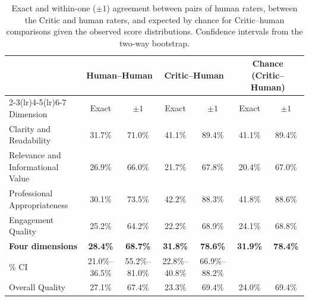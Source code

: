 \documentclass[a4paper,twoside]{article}
\begin{document}
\begin{table}[t]
\centering
\caption{Exact and within-one ($\pm1$) agreement between pairs of human raters, between the Critic and human raters, and expected by chance for Critic--human comparisons given the observed score distributions. Confidence intervals from the two-way bootstrap.}
\label{tab:agreement}
\small
\begin{tabular}{lcccccc}
\toprule
 & \multicolumn{2}{c}{Human--Human} & \multicolumn{2}{c}{Critic--Human} & \multicolumn{2}{c}{Chance (Critic--Human)} \\
\cmidrule(lr){2-3}\cmidrule(lr){4-5}\cmidrule(lr){6-7}
Dimension & Exact & $\pm1$ & Exact & $\pm1$ & Exact & $\pm1$ \\
\midrule
Clarity and Readability & 31.7\% & 71.0\% & 41.1\% & 89.4\% & 41.1\% & 89.4\% \\
Relevance and Informational Value & 26.9\% & 66.0\% & 21.7\% & 67.8\% & 20.4\% & 67.0\% \\
Professional Appropriateness & 30.1\% & 73.5\% & 42.2\% & 88.3\% & 41.8\% & 88.6\% \\
Engagement Quality & 25.2\% & 64.2\% & 22.2\% & 68.9\% & 24.1\% & 68.8\% \\
\midrule
\textbf{Four dimensions} & \textbf{28.4\%} & \textbf{68.7\%} & \textbf{31.8\%} & \textbf{78.6\%} & \textbf{31.9\%} & \textbf{78.4\%} \\
\quad 95\% CI & 21.0\%--36.5\% & 55.2\%--81.0\% & 22.8\%--40.8\% & 66.9\%--88.2\% & & \\
\midrule
Overall Quality & 27.1\% & 67.4\% & 23.3\% & 69.4\% & 24.0\% & 69.4\% \\
\bottomrule
\end{tabular}
\end{table}
\end{document}
